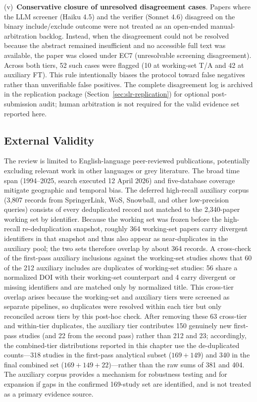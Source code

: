 (v)~\textbf{Conservative closure of unresolved disagreement cases}.
Papers where the LLM screener (Haiku 4.5) and the verifier (Sonnet 4.6)
disagreed on the binary include/exclude outcome were not treated as an
open-ended manual-arbitration backlog. Instead, when the disagreement could
not be resolved because the abstract remained insufficient and no accessible
full text was available, the paper was closed under EC7 (unresolvable
screening disagreement). Across both tiers, 52 such cases were flagged
(10 at working-set T/A and 42 at auxiliary FT). This rule intentionally biases the
protocol toward false negatives rather than unverifiable false positives.
The complete disagreement log is archived in the replication package
(Section~\ref{sec:slr-replication}) for optional post-submission audit;
human arbitration is not required for the valid evidence set reported here.

\subsection{External Validity}
\label{sec:slr-extval}

The review is limited to English-language peer-reviewed publications,
potentially excluding relevant work in other languages or grey literature.
The broad time span (1994--2025, search executed 12 April 2026) and
five-database coverage mitigate geographic and temporal bias. The deferred
high-recall auxiliary corpus (3{,}807 records from SpringerLink, WoS,
Snowball, and other low-precision queries) consists of every deduplicated
record not matched to the 2{,}340-paper working set by identifier. Because
the working set was frozen before the high-recall re-deduplication snapshot,
roughly 364 working-set papers carry divergent identifiers in that snapshot
and thus also appear as near-duplicates in the auxiliary pool; the two sets
therefore overlap by about 364 records. A cross-check of the
first-pass auxiliary inclusions against the working-set studies shows that
60 of the 212 auxiliary includes are duplicates of working-set studies:
56 share a normalized DOI with their working-set counterpart and 4 carry
divergent or missing identifiers and are matched only by normalized title.
This cross-tier overlap arises because the working-set and auxiliary tiers
were screened as separate pipelines, so duplicates were resolved within each
tier but only reconciled across tiers by this post-hoc check. After removing
these 63 cross-tier and within-tier
duplicates, the auxiliary tier contributes 150 genuinely new first-pass
studies (and 22 from the second pass) rather than 212 and 23; accordingly,
the combined-tier distributions reported in this chapter use the
de-duplicated counts---318 studies in the first-pass analytical subset
($169 + 149$) and 340 in the final combined set ($169 + 149 + 22$)---rather
than the raw sums of 381 and 404. The auxiliary corpus provides a
mechanism for robustness testing and for expansion if gaps in the confirmed
169-study set are identified, and is not treated as a primary evidence
source.

